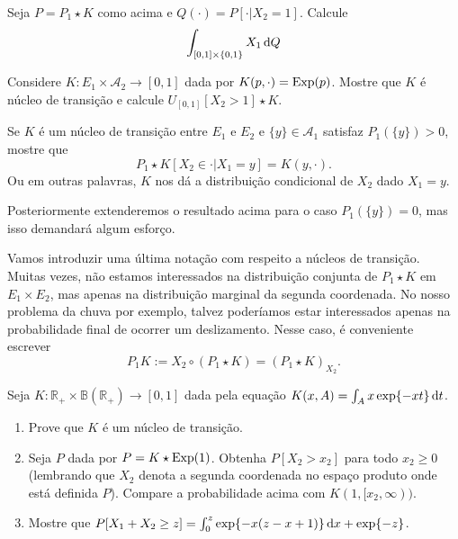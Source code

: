 \begin{exercise}
  Seja $P = P_1 \star K$ como acima e $Q(\cdot) = P[\cdot | X_2 = 1]$.
  Calcule
  \begin{equation}
    \int_{[0,1] \times \{0,1\}} X_1 \mathop{}\!\mathrm{d} Q
  \end{equation}
\end{exercise}

\begin{exercise}
  Considere $K:E_1 \times \mathcal{A}_2 \to [0,1]$ dada por $K(p, \cdot) = \operatorname{Exp}(p)$.
  Mostre que $K$ é núcleo de transição e calcule $U_{[0,1]}[X_2 > 1] \star K$.
\end{exercise}

\begin{exercise}
  Se $K$ é um núcleo de transição entre $E_1$ e $E_2$ e $\{y\} \in \mathcal{A}_1$ satisfaz $P_1(\{y\}) > 0$, mostre que
  \begin{equation}
    P_1 \star K [X_2 \in \cdot | X_1 = y] = K(y, \cdot).
  \end{equation}
  Ou em outras palavras, $K$ nos dá a distribuição condicional de $X_2$ dado $X_1 = y$.
\end{exercise}

Posteriormente extenderemos o resultado acima para o caso $P_1(\{y\}) = 0$, mas isso demandará algum esforço.

Vamos introduzir uma última notação com respeito a núcleos de transição.
Muitas vezes, não estamos interessados na distribuição conjunta de $P_1 \star K$ em $E_1 \times E_2$, mas apenas na distribuição marginal da segunda coordenada.
No nosso problema da chuva por exemplo, talvez poderíamos estar interessados apenas na probabilidade final de ocorrer um deslizamento.
Nesse caso, é conveniente escrever
\begin{equation}
  \label{e:P1_K}
  P_1 K := X_2 \circ (P_1 \star K) = (P_1 \star K)_{X_2}.
\end{equation}

\begin{exercise}
  Seja $K:\mathbb{R}_+ \times \mathbb{B}(\mathbb{R}_+) \to [0,1]$ dada pela equação $K(x,A) = \int_A x \exp\{-x t\} \mathop{}\!\mathrm{d} t$.
  \begin{enumerate}[\quad a)]
  \item Prove que $K$ \'e um n\'ucleo de transi\c{c}\~ao.
  \item Seja $P$ dada por $P = K \star \textnormal{Exp}(1)$.
    Obtenha $P[X_2 > x_2]$ para todo $x_2 \geq 0$ (lembrando que $X_2$ denota a segunda coordenada no espa\c{c}o produto onde est\'a definida $P$).
    Compare a probabilidade acima com $K(1,[x_2, \infty))$.
  \item Mostre que $P[X_1 + X_2 \geq z] = \int_0^z \exp \{-x(z-x+1)\} \mathop{}\!\mathrm{d} x + \exp\{-z\}$.
  \end{enumerate}
\end{exercise}

